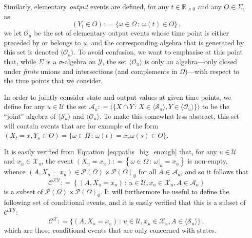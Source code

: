 \documentclass[twoside,11pt]{article}
\newcommand{\reals}{\mathbb{R}}
\newcommand{\realsnonneg}{\reals_{\geq 0}}
\newcommand{\states}{\mathcal{X}}
\newcommand{\observs}{\mathcal{Y}}
\newcommand{\coloneqq}{:\!=}
\begin{document}
Similarly, elementary \emph{output} events are defined, for any $t\in\realsnonneg$ and any $O\in\Sigma$, as
\begin{equation*}
(Y_t \in O) \coloneqq \{ \omega\in\Omega\,:\,\omega(t)\in O \}\,,
\end{equation*}
we let $\mathcal{O}_u$ be the set of elementary output events whose time point is either preceded by or belongs to $u$, and the corresponding algebra that is generated by this set is denoted $\langle\mathcal{O}_u\rangle$. To avoid confusion, we want to emphasise at this point that, while $\Sigma$ is a $\sigma$-algebra on $\observs$, the set $\langle \mathcal{O}_u\rangle$ is only an algebra---only closed under \emph{finite} unions and intersections (and complements in $\Omega$)---with respect to the time points that we consider. 

In order to jointly consider state and output values at given time points, we define for any $u\in\mathcal{U}$ the set $\mathcal{A}_u\coloneqq \langle \{ X\cap Y\,:\,X\in\langle\mathcal{S}_u\rangle, Y\in\langle\mathcal{O}_u\rangle\} \rangle$ to be the ``joint'' algebra of $\langle\mathcal{S}_u\rangle$ and $\langle\mathcal{O}_u\rangle$. To make this somewhat less abstract, this set will contain events that are for example of the form $(X_t=x, Y_s\in O)=\{\omega\in\Omega\,:\,\omega(t)=x,\omega(s)\in O\}$.

It is easily verified from Equation~\eqref{eq:paths_big_enough} that, for any $u\in\mathcal{U}$ and $x_u\in\states_u$, the event $(X_u=x_u)\coloneqq\left\{\omega\in\Omega\,:\,\omega\vert_u=x_u\right\}$ is non-empty, whence $(A,X_u=x_u)\in \mathcal{P}(\Omega)\times \mathcal{P}(\Omega)_\emptyset$ for all $A\in\mathcal{A}_u$, and so it follows that
\begin{equation*}
\mathcal{C}^{\states\observs} \coloneqq \left\{ (A, X_u=x_u)\,:\, u\in\mathcal{U}, x_u\in\states_u, A\in\mathcal{A}_u \right\}
\end{equation*}
is a subset of $\mathcal{P}(\Omega)\times \mathcal{P}(\Omega)_\emptyset$. It will furthermore be useful to define the following set of conditional events, and it is easily verified that this is a subset of $\mathcal{C}^{\states\observs}$:
\begin{equation*}
\mathcal{C}^{\states} \coloneqq \{(A,X_u=x_u)\,:\,u\in\mathcal{U},x_u\in\states_u,A\in\langle\mathcal{S}_u\rangle\}\,,
\end{equation*}
which are those conditional events that are only concerned with states.
\end{document}
